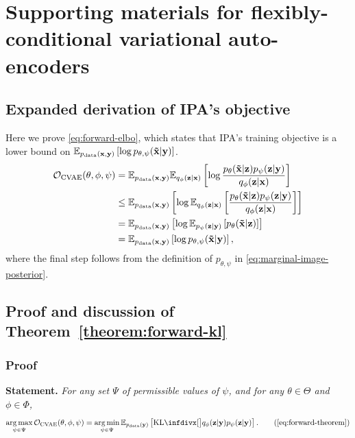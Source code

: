 \chapter{Supporting materials for flexibly-conditional variational auto-encoders}


\section{Expanded derivation of IPA's objective} \label{supp:cigcvae-forward-elbo-bound-deriv}
Here we prove \cref{eq:forward-elbo}, which states that IPA's training
objective is a lower bound on $\mathbb{E}_{p_{\rm{data}} ({\mathbf{x}}, {\mathbf{y}})} \left[ \log
  p_{\theta,\psi}(\mathbf{\tilde{x}}{}|{\mathbf{y}}) \right]$.
\begin{align}
  {\mathcal{O}}_\text{CVAE}(\theta, \phi, \psi ) &= \mathbb{E}_{p_{\rm{data}} ({\mathbf{x}}, {\mathbf{y}})} \mathbb{E}_{q_\phi({\mathbf{z}}|{\mathbf{x}})} \left[ \log \frac{p_\theta(\mathbf{\tilde{x}}{}|{\mathbf{z}})p_\psi({\mathbf{z}}|{\mathbf{y}})}{q_\phi({\mathbf{z}}|{\mathbf{x}})} \right] \\
                                                   &\leq \mathbb{E}_{p_{\rm{data}} ({\mathbf{x}}, {\mathbf{y}})} \left[ \log \mathbb{E}_{q_\phi({\mathbf{z}}|{\mathbf{x}})} \left[ \frac{p_\theta(\mathbf{\tilde{x}}{}|{\mathbf{z}})p_\psi({\mathbf{z}}|{\mathbf{y}})}{q_\phi({\mathbf{z}}|{\mathbf{x}})} \right]  \right] \\
                                                   &= \mathbb{E}_{p_{\rm{data}} ({\mathbf{x}}, {\mathbf{y}})} \left[ \log \mathbb{E}_{p_\psi({\mathbf{z}}|{\mathbf{y}})} \left[ p_\theta(\mathbf{\tilde{x}}{}|{\mathbf{z}}) \right]  \right] \\
                                                   &= \mathbb{E}_{p_{\rm{data}} ({\mathbf{x}}, {\mathbf{y}})} \left[ \log p_{\theta,\psi}(\mathbf{\tilde{x}}{}|{\mathbf{y}}) \right],
\end{align}
where the final step follows from the definition of $p_{\theta,\psi}$ in
\cref{eq:marginal-image-posterior}.


\section{Proof and discussion of Theorem~\ref{theorem:forward-kl}} \label{proof:forward-kl}
\subsection{Proof}
\textbf{Statement.}
\textit{
  For any set $\Psi$ of
  permissible values of $\psi $, and for any $\theta\in\Theta$ and
  $\phi\in\Phi$,
  \begin{equation}
    \argmax_{\psi  \in \Psi} \gO_\text{CVAE}(\theta, \phi, \psi ) = \argmin_{\psi  \in \Psi} \EX_{\pdata (\rvy)} \left[ \kl[\big]{ q_\phi(\rvz|\rvy) }{ p_\psi(\rvz|\rvy) } \right]. \tag{\ref{eq:forward-theorem}}
  \end{equation}
}

